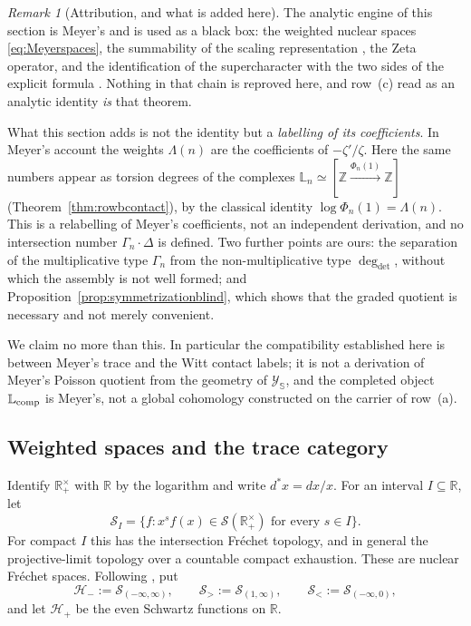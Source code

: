 \documentclass[11pt]{amsart}
\theoremstyle{definition}
\theoremstyle{remark}
\newtheorem{remark}[theorem]{Remark}
\newcommand{\R}{\mathbb R}
\newcommand{\Z}{\mathbb Z}
\begin{document}
\begin{remark}[Attribution, and what is added here]
\label{rem:rowcattribution}
The analytic engine of this section is Meyer's and is used as a black box:
the weighted nuclear spaces \eqref{eq:Meyerspaces}, the summability of the
scaling representation \cite[Proposition~5.6]{MeyerZeta}, the Zeta operator,
and the identification of the supercharacter with the two sides of the
explicit formula \cite[Theorem~5.8]{MeyerZeta}.  Nothing in that chain is
reproved here, and row~(c) read as an analytic identity \emph{is} that
theorem.

What this section adds is not the identity but a \emph{labelling of its
coefficients}.  In Meyer's account the weights $\Lambda(n)$ are the coefficients of
$-\zeta'/\zeta$.  Here the same numbers appear as torsion degrees of the
complexes $\mathbb L_n\simeq[\Z\xrightarrow{\Phi_n(1)}\Z]$
(Theorem~\ref{thm:rowbcontact}), by the classical identity
$\log\Phi_n(1)=\Lambda(n)$.  This is a relabelling of Meyer's coefficients,
not an independent derivation, and no intersection number
$\Gamma_n\cdot\Delta$ is defined.  Two further points are ours: the
separation of the multiplicative type $\Gamma_n$ from the non-multiplicative
type $\deg_{\det}$, without which the assembly is not well formed; and
Proposition~\ref{prop:symmetrizationblind}, which shows that the graded
quotient is necessary and not merely convenient.

We claim no more than this.  In particular the compatibility established
here is between Meyer's trace and the Witt contact labels; it is not a
derivation of Meyer's Poisson quotient from the geometry of
$\mathscr Y_{\mathbb S}$, and the completed object $\mathbb L_{\rm comp}$ is
Meyer's, not a global cohomology constructed on the carrier of row~(a).
\end{remark}

\subsection{Weighted spaces and the trace category}

Identify $\R_+^\times$ with $\R$ by the logarithm and write
$d^*x=dx/x$.  For an interval $I\subseteq\R$, let
\begin{equation}\label{eq:weightedSchwartz}
 \mathcal S_I=\{f:x^sf(x)\in\mathcal S(\R_+^\times)
                  \text{ for every }s\in I\}.
\end{equation}
For compact $I$ this has the intersection Fr\'echet topology, and in
general the projective-limit topology over a countable compact exhaustion.
These are nuclear Fr\'echet spaces.  Following
\cite[\S2]{MeyerZeta}, put
\begin{equation}\label{eq:Meyerspaces}
 \mathcal H_-:=\mathcal S_{(-\infty,\infty)},\qquad
 \mathcal S_>:=\mathcal S_{(1,\infty)},\qquad
 \mathcal S_<:=\mathcal S_{(-\infty,0)},
\end{equation}
and let $\mathcal H_+$ be the even Schwartz functions on $\R$.
\end{document}
